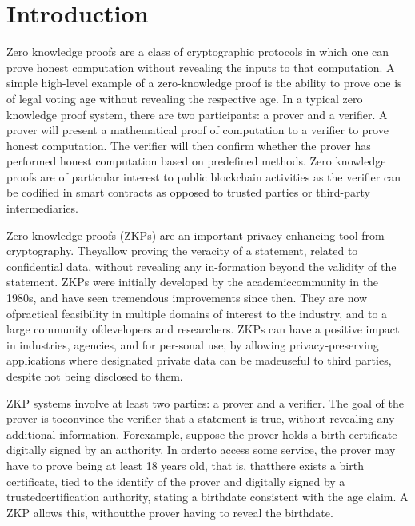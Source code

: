 \chapter{Introduction}


Zero knowledge proofs are a class of cryptographic protocols in which one can prove
honest computation without revealing the inputs to that computation. A simple high-level
example of a zero-knowledge proof is the ability to prove one is of legal voting age
without revealing the respective age. In a typical zero knowledge proof system, there
are two participants: a prover and a verifier. A prover will present a mathematical proof
of computation to a verifier to prove honest computation. The verifier will then confirm
whether the prover has performed honest computation based on predefined methods.
Zero knowledge proofs are of particular interest to public blockchain activities as the
verifier can be codified in smart contracts as opposed to trusted parties or third-party
intermediaries.


Zero-knowledge proofs (ZKPs) are an important privacy-enhancing tool from cryptography. Theyallow proving the veracity of a statement, related to confidential data, without revealing any in-formation beyond the validity of the statement. ZKPs were initially developed by the academiccommunity in the 1980s, and have seen tremendous improvements since then. They are now ofpractical feasibility in multiple domains of interest to the industry, and to a large community ofdevelopers and researchers. ZKPs can have a positive impact in industries, agencies, and for per-sonal use, by allowing privacy-preserving applications where designated private data can be madeuseful to third parties, despite not being disclosed to them. 

ZKP systems involve at least two parties: a prover and a verifier. The goal of the prover is toconvince the verifier that a statement is true, without revealing any additional information. Forexample, suppose the prover holds a birth certificate digitally signed by an authority. In orderto access some service, the prover may have to prove being at least 18 years old, that is, thatthere exists a birth certificate, tied to the identify of the prover and digitally signed by a trustedcertification authority, stating a birthdate consistent with the age claim. A ZKP allows this, withoutthe prover having to reveal the birthdate.


